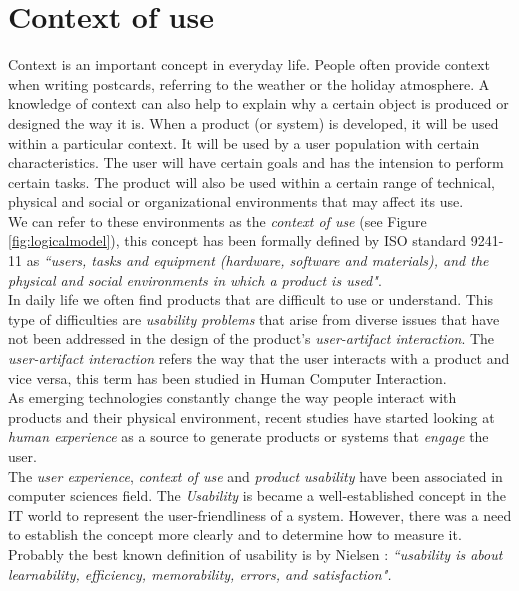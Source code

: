 \section{Context of use}\label{contextofuse}

Context is an important concept in everyday life. People often provide
context when writing postcards, referring to the weather or the holiday
atmosphere. A knowledge of context can also help to explain why a certain
object is produced or designed the way it is. When a product 
(or system) is developed, it
will be used within a particular context. It will be used by a user
population with certain characteristics. The user will have certain
goals and has the intension to perform certain tasks. The product will also be used
within a certain range of technical, physical and social or
organizational environments \cite{maguire2001context} that may affect
its use.\\   
We can refer to these environments as the \textit{context of use} (see
Figure \ref{fig:logicalmodel}), this concept has been formally defined
by ISO standard 9241-11 \cite{international1998iso} as \textit{``users,
tasks and equipment (hardware, software and materials), and the
physical and social environments in which a product is used"}. \\ 
In daily life we often find products that are difficult to use or
understand. This type of difficulties are \textit{usability problems}
that arise from  diverse issues that have not been addressed in the
design of the product's \textit{user-artifact interaction}. The
\textit{user-artifact interaction} refers the way that the user
interacts with a product and vice versa, this term has been studied
in Human Computer Interaction. \\As emerging technologies constantly
change the way people interact with products and their physical
environment, recent studies have started looking at \textit{human
experience} as a source to generate products or systems that
\textit{engage} the user.\\
The \textit{user experience}, \textit{context of use} and
\textit{product usability} have been associated in computer sciences
field. The \textit{Usability} is became a well-established concept in
the IT world to represent the user-friendliness of a system. However,
there was a need to establish the concept more clearly and to
determine how to measure it. Probably the best known definition of
usability is by Nielsen \cite{nielsen1994usability}: 
\textit{``usability is about learnability, efficiency, 
memorability, errors, and satisfaction".}
